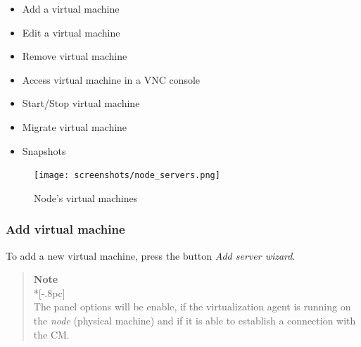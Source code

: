 \begin{itemize}
	\item Add a virtual machine
    \item Edit a virtual machine
	\item Remove virtual machine
	\item Access virtual machine in a VNC console
	\item Start/Stop virtual machine
    \item Migrate virtual machine
    \item Snapshots
\end{itemize}
\begin{figure}[H]
	\begin{center}
	\texttt{[image: screenshots/node\_servers.png]}
	\caption{Node's virtual machines}
	\label{fig:node_servers}
	\end{center}
\end{figure}

\subsubsection{Add virtual machine}
\label{sec:add_server}

To add a new virtual machine, press the button \emph{Add server wizard}.
\begin{quote}
	{\large \bf Note} \\*[-.8pc]
	\underline{\hspace{6in}} \\
    The panel options will be enable, if the virtualization agent is running on the \emph{node} (physical machine) and if it is able to establish a connection with the CM.
\end{quote}
 

